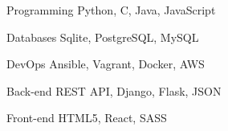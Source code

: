 

\begin{cvskills}

  \cvskill
    {Programming} %
    {Python, C, Java, JavaScript} %

  \cvskill
    {Databases} %
    {Sqlite, PostgreSQL, MySQL} %

  \cvskill
    {DevOps} %
    {Ansible, Vagrant, Docker, AWS} %

  \cvskill
    {Back-end} %
    {REST API, Django, Flask, JSON} %

  \cvskill
    {Front-end} %
    {HTML5, React, SASS} %


\end{cvskills}
